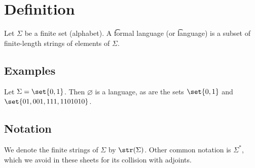 

\section*{Definition}

Let $\Sigma $ be a finite set (alphabet).
A \t{formal language} (or \t{language}) is a subset of finite-length strings of elements of $\Sigma $.

\subsection*{Examples}

Let $\Sigma  = \set{0,1}$.
Then $\varnothing$ is a language, as are the sets $\set{0, 1}$ and $\set{01, 001, 111, 1101010}$.

\subsection*{Notation}

We denote the finite strings of $\Sigma $ by $\str(\Sigma )$.
Other common notation is $\Sigma ^*$, which we avoid in these sheets for its collision with adjoints.

\blankpage